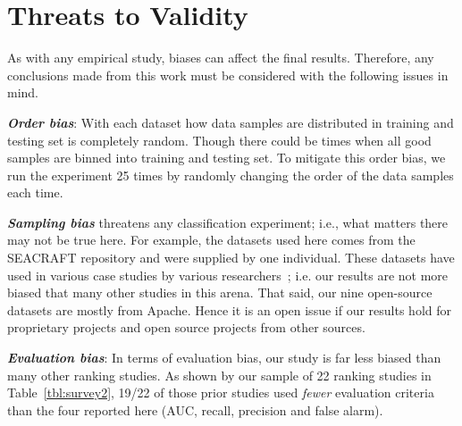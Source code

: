 \documentclass[10pt,conference]{IEEEtran}
\theoremstyle{break}
\theoremstyle{break}
\begin{document}
\section{Threats to Validity}
\label{sect:validity}

As with any empirical study, biases can affect the final
results. Therefore, any conclusions made from this work must be considered with the following issues in mind.

\textbf{\textit{Order bias}}: With each dataset how data samples are distributed in training and testing set is completely random. Though there could be times when all good samples are binned into training and testing set. To mitigate this order bias, we run
the experiment 25 times by randomly changing the order of the data samples each time.

\textbf{\textit{Sampling bias}} threatens any classification experiment; i.e., what matters there may not be true here. For example, the datasets used here comes from the SEACRAFT repository and were supplied by one individual. These datasets have used in various case studies by various researchers~\cite{he2012investigation,peters2013better,peters2013balancing,turhan2013empirical}; i.e. our results are not more biased that many other studies in this arena.
That said, our nine open-source datasets   are mostly from Apache. Hence
it is an open issue if our results hold for
 proprietary projects and open source projects from other sources.


\textbf{\textit{Evaluation bias}}: In terms of evaluation bias,
our study is far less biased than many other ranking studies.  As shown by our sample of
22 ranking studies in
Table~\ref{tbl:survey2}, 19/22 of those prior studies used {\em fewer} evaluation criteria
than the four reported here (AUC, recall, precision and false alarm). 
\end{document}
